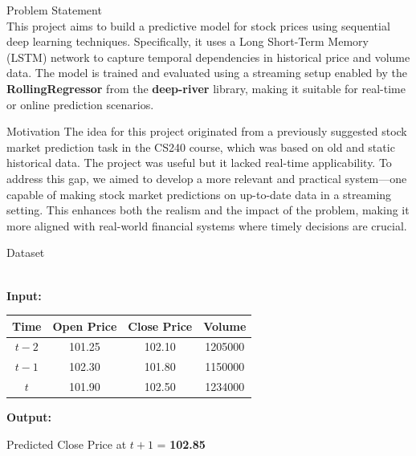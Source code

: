 \documentclass[9pt]{beamer}
\begin{document}
\begin{frame}{Problem Statement}
    \\[0.2cm]
    This project aims to build a predictive model for stock prices using
    sequential deep learning techniques. Specifically, it uses a Long
    Short-Term
    Memory (LSTM) network to capture temporal dependencies in historical price
    and
    volume data. The model is trained and evaluated using a streaming setup
    enabled
    by the \textbf{RollingRegressor} from the \textbf{deep-river} library,
    making
    it suitable for real-time or online prediction scenarios.

\end{frame}

\begin{frame}{Motivation}
    The idea for this project originated from a previously suggested stock
    market prediction task in the CS240 course, which was based on old and
    static
    historical data. The project was useful but it lacked real-time
    applicability.
    To address this gap, we aimed to develop a more relevant and practical
    system—one capable of making stock market predictions on up-to-date data in
    a
    streaming setting. This enhances both the realism and the impact of the
    problem, making it more aligned with real-world financial systems where
    timely
    decisions are crucial.
\end{frame}

\begin{frame}{Dataset}

    \\[0.3cm]

    \textbf{Input:}
    \begin{table}[h!]
        \centering
        \begin{tabular}{|c|c|c|c|}
            \hline
            \textbf{Time} & \textbf{Open Price} & \textbf{Close Price} &
            \textbf{Volume}
            \\
            \hline
            $t-2$         & 101.25              & 102.10               &
            1205000                                                      \\
            $t-1$         & 102.30              & 101.80               &
            1150000                                                      \\
            $t$           & 101.90              & 102.50               &
            1234000                                                      \\
            \hline
        \end{tabular}
    \end{table}

    \textbf{Output:}\\
    \begin{center}
        Predicted Close Price at $t+1$ = \textbf{102.85}
    \end{center}
\end{frame}
\end{document}
